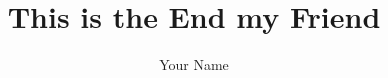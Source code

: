 \documentclass{seal_thesis}
\title{This is the End my Friend}
\author{Your Name}
\begin{document}


\onehalfspace

\frontmatter



\begin{otherlanguage}{ngerman}

\end{otherlanguage}

\tableofcontents

\listoffigures

\vspace{0.1em}

\listoftables

\vspace{0.1em}

\newpage
\thispagestyle{empty}

\mainmatter

%




%
%
%

\backmatter




\end{document}
